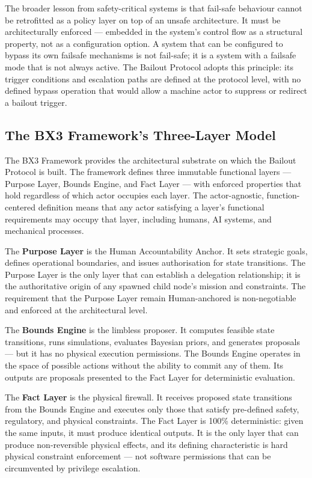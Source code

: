 The broader lesson from safety-critical systems is that fail-safe behaviour cannot be retrofitted as a policy layer on top of an unsafe architecture. It must be architecturally enforced — embedded in the system's control flow as a structural property, not as a configuration option. A system that can be configured to bypass its own failsafe mechanisms is not fail-safe; it is a system with a failsafe mode that is not always active. The Bailout Protocol adopts this principle: its trigger conditions and escalation paths are defined at the protocol level, with no defined bypass operation that would allow a machine actor to suppress or redirect a bailout trigger.

\subsection{The BX3 Framework's Three-Layer Model}
\label{sec:bx3-model}

The BX3 Framework provides the architectural substrate on which the Bailout Protocol is built. The framework defines three immutable functional layers — Purpose Layer, Bounds Engine, and Fact Layer — with enforced properties that hold regardless of which actor occupies each layer. The actor-agnostic, function-centered definition means that any actor satisfying a layer's functional requirements may occupy that layer, including humans, AI systems, and mechanical processes.

The \textbf{Purpose Layer} is the Human Accountability Anchor. It sets strategic goals, defines operational boundaries, and issues authorisation for state transitions. The Purpose Layer is the only layer that can establish a delegation relationship; it is the authoritative origin of any spawned child node's mission and constraints. The requirement that the Purpose Layer remain Human-anchored is non-negotiable and enforced at the architectural level.

The \textbf{Bounds Engine} is the limbless proposer. It computes feasible state transitions, runs simulations, evaluates Bayesian priors, and generates proposals — but it has no physical execution permissions. The Bounds Engine operates in the space of possible actions without the ability to commit any of them. Its outputs are proposals presented to the Fact Layer for deterministic evaluation.

The \textbf{Fact Layer} is the physical firewall. It receives proposed state transitions from the Bounds Engine and executes only those that satisfy pre-defined safety, regulatory, and physical constraints. The Fact Layer is 100\% deterministic: given the same inputs, it must produce identical outputs. It is the only layer that can produce non-reversible physical effects, and its defining characteristic is hard physical constraint enforcement — not software permissions that can be circumvented by privilege escalation.

